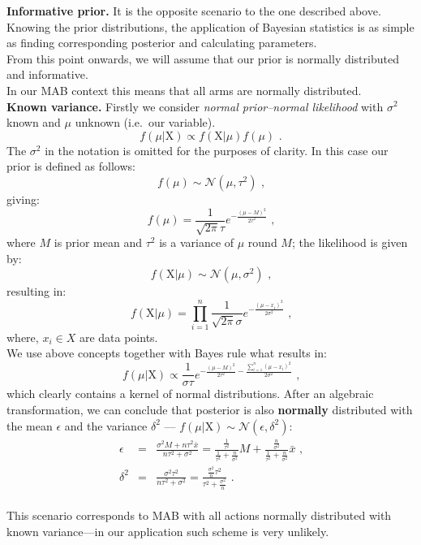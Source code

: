 \documentclass[12pt, a4paper, pdflatex, leqno, twoside]{report}
\begin{document}
\textbf{\textrm{Informative prior. }}It is the opposite scenario to the one 
described above. Knowing the prior distributions, the application of Bayesian 
statistics is as simple as finding corresponding posterior and calculating 
parameters.\\
From this point onwards, we will assume that our prior is normally distributed
and informative. \\
In our MAB context this means that all arms are normally distributed.\\[1.5cm]




\textbf{\textrm{Known variance. }}Firstly we consider \emph{normal prior--normal likelihood} with $\sigma^2$ known and $\mu$ unknown (i.e.\ our variable).
$$
f \left( \mu | \mathrm{X} \right) \propto f \left( \mathrm{X} | \mu \right) f 
\left( \mu \right) \text{ .}
$$
The $\sigma^2$ in the notation is omitted for the purposes of clarity. In this case our
prior is defined as follows:
$$
f \left( \mu \right)    \sim   \mathcal{N}\left( \mu, \tau^2 \right) \text{ ,}
$$
giving:
$$
f \left( \mu \right)    =     \frac{1}{\sqrt{2\pi} \tau} e^{- \frac{{\left( \mu 
- M \right)}^2}{2 \tau^2} } \text{ ,}
$$
where $M$ is prior mean and $\tau^2$ is a variance of $\mu$ round $M$; the likelihood 
is given by:
$$
f \left( \mathrm{X} | \mu \right)     \sim    \mathcal{N}\left( \mu, \sigma^2 
\right) \text{ ,}
$$
resulting in:
$$
f \left( \mathrm{X} | \mu \right)    =     \prod_{i=1}^{n} \frac{1}{\sqrt{2\pi} 
\sigma} e^{- \frac{{\left( \mu - x_i \right)}^2}{2 \sigma^2} } \text{ ,}
$$
where, $x_i \in X$ are data points.\\
We use above concepts together with Bayes rule what results in: 
$$
f \left( \mu | \mathrm{X} \right)     \propto     \frac{1}{\sigma \tau} e^{ -
\frac{ {\left( \mu - M \right)}^2 }{2 \tau^2} -\frac{ \sum_{i=1}^{n} {\left( 
\mu - x_i \right)}^2 }{2 \sigma^2} } \text{ ,}
$$
which clearly contains a kernel of normal distributions. After an algebraic 
transformation, we can conclude
that posterior is also \textbf{normally} distributed 
with the mean $\epsilon$ and the variance $\delta^2$ --- $f \left( \mu | \mathrm{X} 
\right) \sim \mathcal{N} \left( \epsilon, \delta^2 \right) $:
\begin{eqnarray*}
\epsilon &=& \frac{\sigma^2 M + n \tau^2 \bar{x}}{n \tau^2 + \sigma^2} = \frac{ 
\frac{1}{\tau^2} }{ \frac{1}{\tau^2} + \frac{n}{\sigma^2} }M + \frac{ 
\frac{n}{\sigma^2} }{ \frac{1}{\tau^2} + \frac{n}{\sigma^2} } \bar{x} \text{ ,} 
\\
\delta^2 &=& \frac{\sigma^2 \tau^2}{n \tau^2 + \sigma^2} = \frac{ 
\frac{\sigma^2}{n} \tau^2 }{ \tau^2 + \frac{\sigma^2}{n} } \text{ .}
\end{eqnarray*}
\\
This scenario corresponds to MAB with all actions normally distributed with known variance---in our application such scheme is very unlikely.\\[1.5cm]
\end{document}
